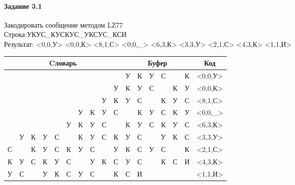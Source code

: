 \documentclass[a4paper, 12pt]{article}
\begin{document}
\pagebreak
\paragraph{Задание 3.1}

Закодировать сообщение методом LZ77\\
Строка:УКУС\_КУСКУС\_УКСУС\_КСИ\\
Результат: <0,0,У> <0,0,К> <8,1,С> <0,0,\_> <6,3,К> <3,3,У> <2,1,С> <4,3,К> <1,1,И>\\
\begin{table}[h!]
\centering
\begin{tabular}{|c|c|c|c|c|c|c|c|c|c|c|c|c|c|c|c|c|} 
\hline
\multicolumn{10}{|c|}{Cловарь} & \multicolumn{6}{c|}{Буфер} & Код  \\ \hline
  &   &   &   &   &   &   &   &   &   & \cellcolor[HTML]{8CE4F6} У & К & У & С &   & К & <0,0,У>
\\ \hline
  &   &   &   &   &   &   &   &   & У & \cellcolor[HTML]{8CE4F6} К & У & С &   & К & У & <0,0,К>
\\ \hline
  &   &   &   &   &   &   &   & \cellcolor[HTML]{FFFF00} У & К & \cellcolor[HTML]{FFFF00} У & \cellcolor[HTML]{8CE4F6} С &   & К & У & С & <8,1,С>
\\ \hline
  &   &   &   &   &   & У & К & У & С & \cellcolor[HTML]{8CE4F6}   & К & У & С & К & У & <0,0,\_>
\\ \hline
  &   &   &   &   & У & \cellcolor[HTML]{FFFF00} К & \cellcolor[HTML]{FFFF00} У & \cellcolor[HTML]{FFFF00} С &   & \cellcolor[HTML]{FFFF00} К & \cellcolor[HTML]{FFFF00} У & \cellcolor[HTML]{FFFF00} С & \cellcolor[HTML]{8CE4F6} К & У & С & <6,3,К>
\\ \hline
  & У & К & \cellcolor[HTML]{FFFF00} У & \cellcolor[HTML]{FFFF00} С & \cellcolor[HTML]{FFFF00}   & К & У & С & К & \cellcolor[HTML]{FFFF00} У & \cellcolor[HTML]{FFFF00} С & \cellcolor[HTML]{FFFF00}   & \cellcolor[HTML]{8CE4F6} У & К & С & <3,3,У>
\\ \hline
С &   & \cellcolor[HTML]{FFFF00} К & У & С & К & У & С &   & У & \cellcolor[HTML]{FFFF00} К & \cellcolor[HTML]{8CE4F6} С & У & С &   & К & <2,1,С>
\\ \hline
К & У & С & К & \cellcolor[HTML]{FFFF00} У & \cellcolor[HTML]{FFFF00} С & \cellcolor[HTML]{FFFF00}   & У & К & С & \cellcolor[HTML]{FFFF00} У & \cellcolor[HTML]{FFFF00} С & \cellcolor[HTML]{FFFF00}   & \cellcolor[HTML]{8CE4F6} К & С & И & <4,3,К>
\\ \hline
У & \cellcolor[HTML]{FFFF00} С &   & У & К & С & У & С &   & К & \cellcolor[HTML]{FFFF00} С & \cellcolor[HTML]{8CE4F6} И &   &   &   &   & <1,1,И>
\\ \hline
\end{tabular}
\end{table}
\end{document}
